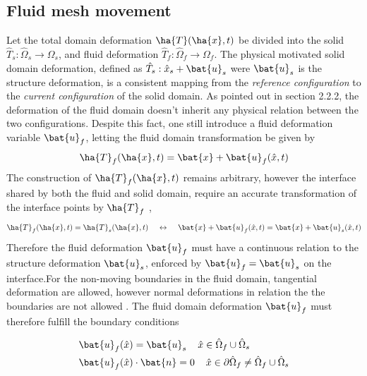 \subsection{Fluid mesh movement}
 Let the total domain deformation $\ha{T}(\ha{x}, t)$ be divided into the solid  $\hat{T}_s: \hat{\Omega}_s \rightarrow \Omega_s$, and fluid deformation $\hat{T}_f: \hat{\Omega}_f \rightarrow \Omega_f$. The physical motivated solid domain deformation, defined as $\hat{T}_s: \hat{x}_s + \bat{u}_s$ were $\bat{u}_s$ is the structure deformation, is 
a consistent mapping from the \textit{reference configuration} to the \textit{current configuration} of the solid domain. As pointed out in section 2.2.2, the deformation of the fluid domain doesn't inherit any physical relation between the two configurations. Despite this fact, one still introduce a fluid deformation variable $\bat{u}_f$, letting the fluid domain transformation be given by 
\begin{align*}
\ha{T}_f(\ha{x}, t) = \bat{x} + \bat{u}_f(\hat{x}, t)
\end{align*}
The construction of $\ha{T}_f(\ha{x}, t) $ remains arbitrary, however the interface shared by both the fluid and solid domain, require an accurate transformation of the interface points by $\ha{T}_f$ \cite{Richter2016}, 
\begin{align*}
\ha{T}_f(\ha{x}, t) = \ha{T}_s(\ha{x}, t) \hspace{4mm}  \leftrightarrow  
\hspace{4mm}\bat{x} + \bat{u}_f(\hat{x}, t) =  \bat{x} + \bat{u}_s(\hat{x}, t)
\end{align*}
Therefore the fluid deformation $\bat{u}_f$ must have a continuous relation to the structure deformation $\bat{u}_s$, enforced by $\bat{u}_f = \bat{u}_s$ on the interface.For the non-moving boundaries in the fluid domain, tangential deformation are allowed, however normal deformations in relation the the boundaries are not allowed \cite{Richter2010c}. The fluid domain deformation $\bat{u}_f$ must therefore fulfill the boundary conditions 

\begin{align}
&\bat{u}_f(\hat{x}) = \bat{u}_s \hspace{4mm} \hat{x} \in \hat{\Omega}_f \cup  \hat{\Omega}_s \\
&\bat{u}_f(\hat{x}) \cdot \bat{n} = 0  \hspace{4mm}  \hat{x} \in \partial \hat{\Omega}_f \neq \hat{\Omega}_f \cup  \hat{\Omega}_s
\end{align} 

